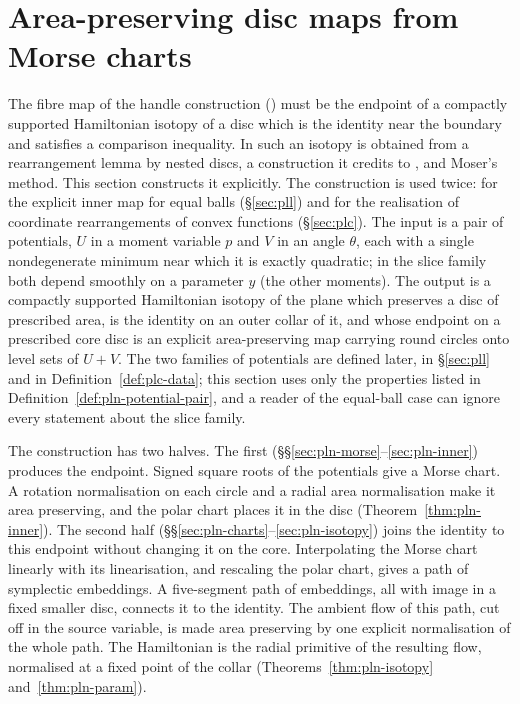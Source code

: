 \section{Area-preserving disc maps from Morse charts}\label{sec:pln}

The fibre map of the handle construction () must be the endpoint of a compactly
supported Hamiltonian isotopy of a disc which is the identity near the boundary and satisfies a comparison
inequality. In \cite{OpenAI2026} such an isotopy is obtained from a rearrangement lemma by nested discs, a construction it
credits to \cite[Lemma~3.2]{SchlenkFolding}, and Moser's method. This section constructs it explicitly. The construction is used twice: for the explicit
inner map for equal balls (\S\ref{sec:pll}) and for the realisation of coordinate rearrangements of convex
functions (\S\ref{sec:plc}). The input is a pair of potentials, $U$ in a moment variable $p$ and $V$ in an angle $\theta$, each with a single
nondegenerate minimum near which it is exactly quadratic; in the slice family both depend smoothly on a parameter $y$
(the other moments).
The output is a compactly supported Hamiltonian isotopy of the plane which preserves a disc of prescribed
area, is the identity on an outer collar of it, and whose endpoint on a prescribed core disc is an explicit
area-preserving map carrying round circles onto level sets of $U+V$. The two families of potentials are defined later, in \S\ref{sec:pll} and in
Definition~\ref{def:plc-data}; this section uses only the properties listed in Definition~\ref{def:pln-potential-pair}, and a
reader of the equal-ball case can ignore every statement about the slice family.

The construction has two halves. The first (\S\S\ref{sec:pln-morse}--\ref{sec:pln-inner}) produces the
endpoint. Signed square roots of the potentials give a Morse chart. A rotation normalisation on each circle
and a radial area normalisation make it area preserving, and the polar chart places it in the disc
(Theorem~\ref{thm:pln-inner}). The second half (\S\S\ref{sec:pln-charts}--\ref{sec:pln-isotopy}) joins the
identity to this endpoint without changing it on the core. Interpolating the Morse chart linearly with its
linearisation, and rescaling the polar chart, gives a path of symplectic embeddings. A five-segment path of
embeddings, all with image in a fixed smaller disc, connects it to the identity. The ambient flow of this
path, cut off in the source variable, is made area preserving by one explicit normalisation of the whole
path. The Hamiltonian is the radial primitive of the resulting flow, normalised at a fixed point of the
collar (Theorems~\ref{thm:pln-isotopy} and~\ref{thm:pln-param}).

